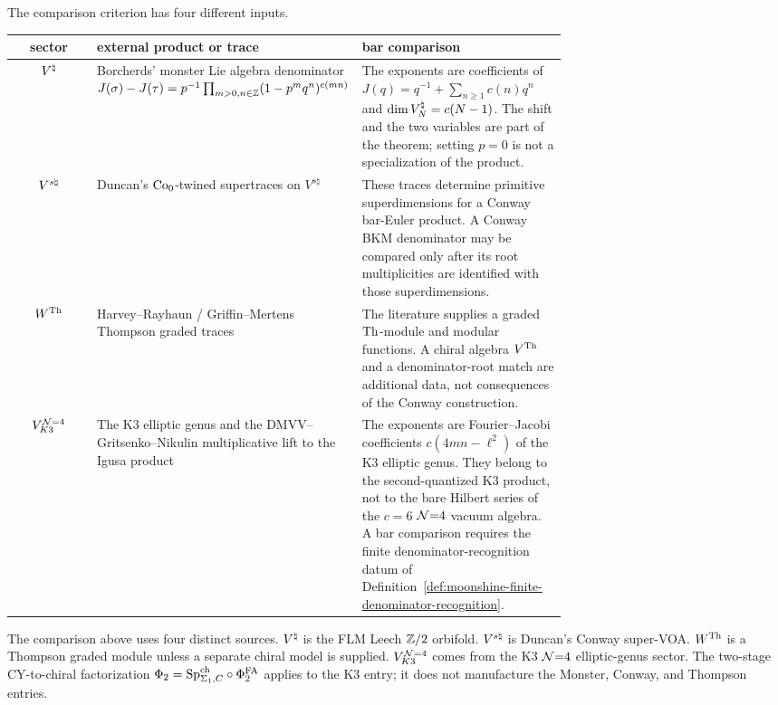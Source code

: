 \begin{remark}
\label{rem:moonshine-sectorwise-exponent-data}
The comparison criterion has four different inputs.
\begin{center}
\begin{tabular}{c|p{0.34\linewidth}|p{0.37\linewidth}}
\textbf{sector} & \textbf{external product or trace} & \textbf{bar comparison}\\
\hline
$V^{\natural}$ &
Borcherds' monster Lie algebra denominator
$J(\sigma)-J(\tau)
=p^{-1}\prod_{m>0,n\in\mathbb Z}(1-p^m q^n)^{c(mn)}$ &
The exponents are coefficients of
$J(q)=q^{-1}+\sum_{n\geq 1}c(n)q^n$ and
$\dim V^{\natural}_N=c(N-1)$.  The shift and the two variables are part of
the theorem; setting $p=0$ is not a specialization of the product.\\
$V^{s\natural}$ &
Duncan's $\mathrm{Co}_0$-twined supertraces on $V^{s\natural}$ &
These traces determine primitive superdimensions for a Conway
bar-Euler product.  A Conway BKM denominator may be compared only
after its root multiplicities are identified with those
superdimensions.\\
$W^{\mathrm{Th}}$ &
Harvey--Rayhaun / Griffin--Mertens Thompson graded traces &
The literature supplies a graded $\mathrm{Th}$-module and modular functions.
A chiral algebra $V^{\mathrm{Th}}$ and a denominator-root match are additional
data, not consequences of the Conway construction.\\
$V_{K3}^{\mathcal N{=}4}$ &
The K3 elliptic genus and the DMVV--Gritsenko--Nikulin multiplicative
lift to the Igusa product &
The exponents are Fourier--Jacobi coefficients
$c(4mn-\ell^2)$ of the K3 elliptic genus.  They belong to the
second-quantized K3 product, not to the bare Hilbert series of the
$c=6$ $\mathcal N{=}4$ vacuum algebra.  A bar comparison requires the finite
denominator-recognition datum of
Definition~\ref{def:moonshine-finite-denominator-recognition}.
\end{tabular}
\end{center}
\end{remark}

\begin{remark}
\label{rem:moonshine-four-inputs-not-one-functor}
The comparison above uses four distinct sources.  $V^{\natural}$ is the FLM
Leech $\mathbb Z/2$ orbifold.  $V^{s\natural}$ is Duncan's Conway super-VOA.
$W^{\mathrm{Th}}$ is a Thompson graded module unless a separate chiral model
is supplied.  $V_{K3}^{\mathcal N{=}4}$ comes from the K3 $\mathcal N{=}4$ elliptic-genus
sector.  The two-stage CY-to-chiral factorization
$\Phi_2=\mathrm{Sp}^{\mathrm{ch}}_{\Sigma_1,C}\circ\Phi^{\mathrm{FA}}_2$ applies to the K3 entry; it
does not manufacture the Monster, Conway, and Thompson entries.
\end{remark}

